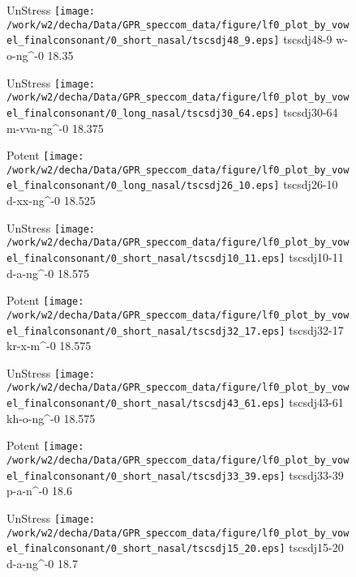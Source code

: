 \documentclass{article}
\begin{document}
\begin{figure}[t]
\begin{minipage}[b]{.24\textwidth}
UnStress
\centering
\texttt{[image: /work/w2/decha/Data/GPR\_speccom\_data/figure/lf0\_plot\_by\_vowel\_finalconsonant/0\_short\_nasal/tscsdj48\_9.eps]}
tscsdj48-9 w-o-ng\textasciicircum-0 18.35
\end{minipage}
\begin{minipage}[b]{.24\textwidth}
UnStress
\centering
\texttt{[image: /work/w2/decha/Data/GPR\_speccom\_data/figure/lf0\_plot\_by\_vowel\_finalconsonant/0\_long\_nasal/tscsdj30\_64.eps]}
tscsdj30-64 m-vva-ng\textasciicircum-0 18.375
\end{minipage}
\begin{minipage}[b]{.24\textwidth}
\colorbox{Apricot}{Potent}
\centering
\texttt{[image: /work/w2/decha/Data/GPR\_speccom\_data/figure/lf0\_plot\_by\_vowel\_finalconsonant/0\_long\_nasal/tscsdj26\_10.eps]}
tscsdj26-10 d-xx-ng\textasciicircum-0 18.525
\end{minipage}
\begin{minipage}[b]{.24\textwidth}
UnStress
\centering
\texttt{[image: /work/w2/decha/Data/GPR\_speccom\_data/figure/lf0\_plot\_by\_vowel\_finalconsonant/0\_short\_nasal/tscsdj10\_11.eps]}
tscsdj10-11 d-a-ng\textasciicircum-0 18.575
\end{minipage}
\end{figure}
\clearpage
\begin{figure}[t]
\begin{minipage}[b]{.24\textwidth}
\colorbox{Apricot}{Potent}
\centering
\texttt{[image: /work/w2/decha/Data/GPR\_speccom\_data/figure/lf0\_plot\_by\_vowel\_finalconsonant/0\_short\_nasal/tscsdj32\_17.eps]}
tscsdj32-17 kr-x-m\textasciicircum-0 18.575
\end{minipage}
\begin{minipage}[b]{.24\textwidth}
UnStress
\centering
\texttt{[image: /work/w2/decha/Data/GPR\_speccom\_data/figure/lf0\_plot\_by\_vowel\_finalconsonant/0\_short\_nasal/tscsdj43\_61.eps]}
tscsdj43-61 kh-o-ng\textasciicircum-0 18.575
\end{minipage}
\begin{minipage}[b]{.24\textwidth}
\colorbox{Apricot}{Potent}
\centering
\texttt{[image: /work/w2/decha/Data/GPR\_speccom\_data/figure/lf0\_plot\_by\_vowel\_finalconsonant/0\_short\_nasal/tscsdj33\_39.eps]}
tscsdj33-39 p-a-n\textasciicircum-0 18.6
\end{minipage}
\begin{minipage}[b]{.24\textwidth}
UnStress
\centering
\texttt{[image: /work/w2/decha/Data/GPR\_speccom\_data/figure/lf0\_plot\_by\_vowel\_finalconsonant/0\_short\_nasal/tscsdj15\_20.eps]}
tscsdj15-20 d-a-ng\textasciicircum-0 18.7
\end{minipage}
\end{figure}
\end{document}

